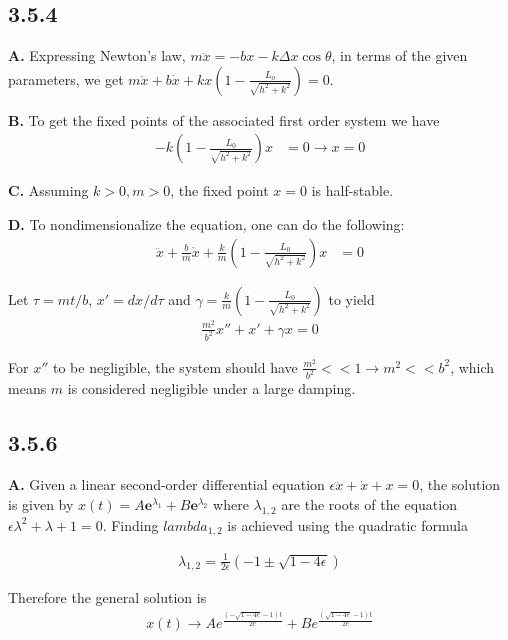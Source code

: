 \documentclass[]{article}
\begin{document}
	\subsection*{3.5.4}
	\textbf{A.} Expressing Newton's law, $m\ddot{x} = -bx -k\Delta x \cos \theta$, in terms of the given parameters, we get $m\ddot{x} + b\dot{x} + kx (1- \frac{L_o}{\sqrt{h^2 + k^2}}) = 0$.
	
	\textbf{B.} To get the fixed points of the associated first order system we have
	\begin{align*}
	-k\left(1-\frac{L_0}{\sqrt{h^2+k^2}}\right)x&=0 \to x=0
	\end{align*}
	
	\textbf{C.} Assuming $k>0, m>0$, the fixed point $x=0$ is half-stable.
	
	\textbf{D.} To nondimensionalize the equation, one can do the following:
	\begin{align*}
	\ddot{x} + \frac{b}{m}\dot{x} + \frac{k}{m}\left(1-\frac{L_0}{\sqrt{h^2+k^2}}\right)x&=0
	\end{align*}
	
	Let $\tau = mt/b$, $x'=dx/d\tau$ and $\gamma=\frac{k}{m}\left(1-\frac{L_0}{\sqrt{h^2+k^2}}\right)$ to yield
	\begin{align*}
	\frac{m^2}{b^2}x'' + x' + \gamma x=0
	\end{align*}
	
	For $x''$ to be negligible, the system should have $\frac{m^2}{b^2}<<1 \to m^2 << b^2$, which means $m$ is considered negligible under a large damping.
	
	\subsection*{3.5.6}
	
	\textbf{A.} Given a linear second-order differential equation $\epsilon \ddot{x} + \dot{x} + x = 0$, the solution is given by $x(t) = A\mathbf{e}^{\lambda_1} + B \mathbf{e}^{\lambda_2}$ where $\lambda_{1,2}$ are the roots of the equation $\epsilon \lambda^2 + \lambda + 1 =0$. Finding $lambda_{1,2}$ is achieved using the quadratic formula
	
	\begin{align*}
	\lambda_{1,2} = \frac{1}{2\epsilon}\left(-1\pm\sqrt{1-4\epsilon}\right)
	\end{align*}
	
	Therefore the general solution is
	\begin{align*}
	x(t)\to A e^{\frac{\left(-\sqrt{1-4 e}-1\right) t}{2 e}}+B e^{\frac{\left(\sqrt{1-4 e}-1\right) t}{2 e}}
	\end{align*}
	
\end{document}

